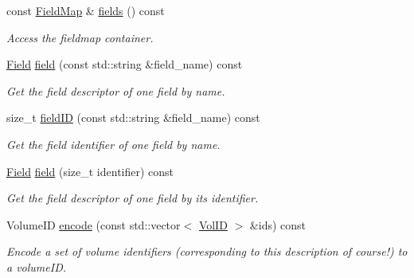 \begin{DoxyCompactItemize}
const \hyperlink{class_d_d4hep_1_1_geometry_1_1_i_d_descriptor_ac9d6740c50e0c5cf495486c55e5640d4}{FieldMap} \& \hyperlink{class_d_d4hep_1_1_geometry_1_1_i_d_descriptor_ac9ac7cfabcfd6f2751cbdb7197404e7c}{fields} () const 
\begin{DoxyCompactList}\small\item\em Access the fieldmap container. \item\end{DoxyCompactList}\item 
\hyperlink{class_d_d4hep_1_1_geometry_1_1_i_d_descriptor_ac06f5915e74f8a8f2ff73e9a322556e4}{Field} \hyperlink{class_d_d4hep_1_1_geometry_1_1_i_d_descriptor_a87e1718a63ccdf8ed06c8acdaf14f617}{field} (const std::string \&field\_\-name) const 
\begin{DoxyCompactList}\small\item\em Get the field descriptor of one field by name. \item\end{DoxyCompactList}\item 
size\_\-t \hyperlink{class_d_d4hep_1_1_geometry_1_1_i_d_descriptor_aa7476c8d4708ec4e103ea3bf0220d162}{fieldID} (const std::string \&field\_\-name) const 
\begin{DoxyCompactList}\small\item\em Get the field identifier of one field by name. \item\end{DoxyCompactList}\item 
\hyperlink{class_d_d4hep_1_1_geometry_1_1_i_d_descriptor_ac06f5915e74f8a8f2ff73e9a322556e4}{Field} \hyperlink{class_d_d4hep_1_1_geometry_1_1_i_d_descriptor_a929d0beaa15914894c8c77f1c4af291a}{field} (size\_\-t identifier) const 
\begin{DoxyCompactList}\small\item\em Get the field descriptor of one field by its identifier. \item\end{DoxyCompactList}\item 
VolumeID \hyperlink{class_d_d4hep_1_1_geometry_1_1_i_d_descriptor_a87bd7f294359971dfdcad72c414597ed}{encode} (const std::vector$<$ \hyperlink{class_d_d4hep_1_1_geometry_1_1_i_d_descriptor_a6928b7adb965c1c276f22f62a0633750}{VolID} $>$ \&ids) const 
\begin{DoxyCompactList}\small\item\em Encode a set of volume identifiers (corresponding to this description of course!) to a volumeID. \item\end{DoxyCompactList}\item 

\end{DoxyCompactItemize}
